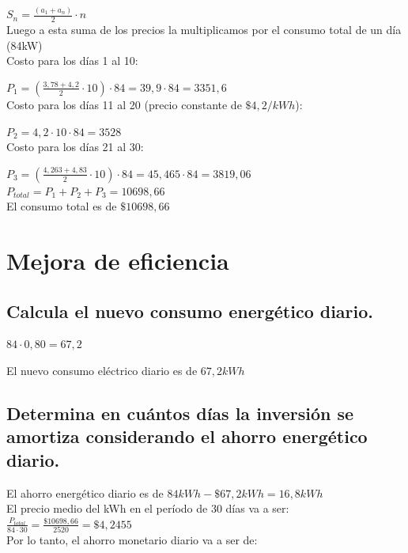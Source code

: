 \documentclass[11pt, a4paper]{article}
\begin{document}
$S_n = \frac{(a_1 + a_n)}{2} \cdot n$ \\

Luego a  esta suma de los precios la multiplicamos por el consumo total de un día (84kW) \\

Costo para los días 1 al 10:

$P_1 = (\frac{3,78 + 4,2}{2} \cdot 10) \cdot 84  = 39,9 \cdot 84 = 3351,6$ \\

Costo para los días 11 al 20 (precio constante de $\$4,2/kWh$):

$P_2 = 4,2 \cdot 10 \cdot 84 = 3528 $\\

Costo para los días 21 al 30:

$P_3 = (\frac{4,263 + 4,83}{2} \cdot 10) \cdot 84  = 45,465 \cdot 84 = 3819,06$ \\


$P_{total} = P_1 + P_2 + P_3 = 10698,66$ \\

El consumo total es de $\$10698,66$

\section{Mejora de eficiencia}

\subsection{Calcula el nuevo consumo energético diario.}

$84 \cdot 0,80 = 67,2$

El nuevo consumo eléctrico diario es de $67,2 kWh$

\subsection{Determina en cuántos días la inversión se amortiza considerando el ahorro energético diario.}

El ahorro energético diario es de $84kWh-\$67,2kWh = 16,8kWh$ \\

El precio medio del kWh en el período de 30 días va a ser:
$\frac{P_{total}}{84\cdot 30} = \frac{\$10698,66}{2520} = \$4,2455$ \\

Por lo tanto, el ahorro monetario diario va a ser de: \\
\end{document}
